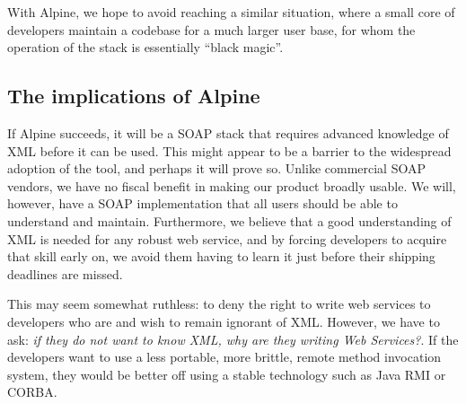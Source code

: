 With Alpine, we hope to avoid reaching a similar situation, where a
small core of developers maintain a codebase for a much larger user
base, for whom the operation of the stack is essentially ``black
magic''.

\subsection{The implications of Alpine}

If Alpine succeeds, it will be a SOAP stack that requires advanced
knowledge of XML before it can be used. This might appear to be a
barrier to the widespread adoption of the tool, and perhaps it will
prove so. Unlike commercial SOAP vendors, we have no fiscal benefit in
making our product broadly usable. We will, however, have a SOAP
implementation that all users should be able to understand and
maintain.  Furthermore, we believe that a good understanding of XML is
needed for any robust web service, and by forcing developers to
acquire that skill early on, we avoid them having to learn it just
before their shipping deadlines are missed.

This may seem somewhat ruthless: to deny the right to write web
services to developers who are and wish to remain ignorant of XML.
However, we have to ask: \emph{if they do not want to know XML, why are
they writing Web Services?}. If the developers want to use a less portable,
more brittle, remote method invocation system, they would be better off
using a stable technology such as Java RMI or CORBA.
